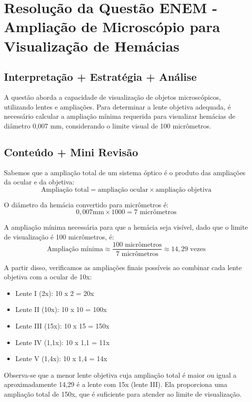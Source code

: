 \documentclass{article}
\begin{document}
\section*{Resolução da Questão ENEM - Ampliação de Microscópio para Visualização de Hemácias}

\subsection*{Interpretação + Estratégia + Análise}

A questão aborda a capacidade de visualização de objetos microscópicos, utilizando lentes e ampliações. Para determinar a lente objetiva adequada, é necessário calcular a ampliação mínima requerida para visualizar hemácias de diâmetro 0,007 mm, considerando o limite visual de 100 micrômetros.

\subsection*{Conteúdo + Mini Revisão}

Sabemos que a ampliação total de um sistema óptico é o produto das ampliações da ocular e da objetiva:
\[
\text{Ampliação total} = \text{ampliação ocular} \times \text{ampliação objetiva}
\]

O diâmetro da hemácia convertido para micrômetros é:
\[
0,007 \text{mm} \times 1000 = 7 \text{ micrômetros}
\]

A ampliação mínima necessária para que a hemácia seja visível, dado que o limite de visualização é 100 micrômetros, é:
\[
\text{Ampliação mínima} \approx \frac{100 \text{ micrômetros}}{7 \text{ micrômetros}} \approx 14,29 \text{ vezes}
\]

A partir disso, verificamos as ampliações finais possíveis ao combinar cada lente objetiva com a ocular de 10x:

\begin{itemize}
\item Lente I (2x): 10 x 2 = 20x
\item Lente II (10x): 10 x 10 = 100x
\item Lente III (15x): 10 x 15 = 150x
\item Lente IV (1,1x): 10 x 1,1 = 11x
\item Lente V (1,4x): 10 x 1,4 = 14x
\end{itemize}

Observa-se que a menor lente objetiva cuja ampliação total é maior ou igual a aproximadamente 14,29 é a lente com 15x (lente III). Ela proporciona uma ampliação total de 150x, que é suficiente para atender ao limite de visualização.
\end{document}
